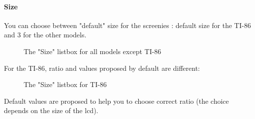 \documentclass[10pt]{report}
\begin{document}
\paragraph{Size}


You can choose between "default" size for the screenies : default size for the TI-86 and 3 for the other models.\newline

\begin{figure}[H]
\centering
{}
\caption{The "Size" listbox for all models except TI-86}
\end{figure}

For the TI-86, ratio and values proposed by default are different: \newline

\begin{figure}[H]
\centering
{}
\caption{The "Size" listbox for TI-86}
\end{figure}

Default values are proposed to help you to choose correct ratio (the choice depends on the size of the lcd).\newline
\end{document}
